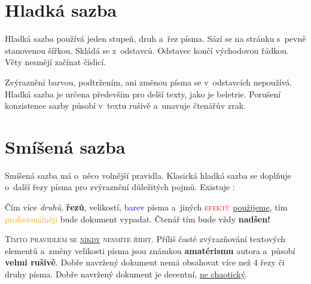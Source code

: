 \documentclass[a4paper, 10pt, twocolumn]{article}
\begin{document}

	\section{Hladká sazba}
	\label{sec:1}

        Hladká sazba používá jeden stupeň, druh a~řez písma.
        Sází se na stránku s~pevně stanovenou šířkou.
        Skládá se z~odstavců. Odstavec končí východovou řádkou.
        Věty nesmějí začínat číslicí.

    	Zvýraznění barvou, podtržením, ani změnou písma se v~odstavcích nepoužívá.
        Hladká sazba je určena především pro delší texty, jako je beletrie.
        Porušení konzistence sazby působí v~textu rušivě a~unavuje čtenářův zrak.

	\section{Smíšená sazba}
	\label{sec:2}
    
        Smíšená sazba má o~něco volnější pravidla. Klasická hladká sazba se doplňuje o~další řezy písma pro zvýraznění důležitých pojmů. Existuje :
    
    	\begin{adjustwidth}{0.62cm}{0.80cm}
    		\medskip
    		\setlength{\parindent}{0.5cm}
    		\hspace{\parindent}
    		Čím více \emph{druhů}, \textbf{řezů}, {\huge velikostí}, \textcolor{blue}{barev} písma a~jiných \textsc{\textcolor{red}{efektů}} \underline{použijeme}, tím \textcolor{orange}{profesionálněji} bude {\Large{\selectfont dokument}} vypadat.
            {\tiny Čtenář} tím bude vždy \textbf{\Huge{nadšen!}}
    		\medskip
    	\end{adjustwidth}
    
    	\textsc{Tímto pravidlem se \underline{nikdy} nesmíte řídit.}
        Příliš časté zvýrazňování textových elementů a~změny {\tiny velikosti} písma jsou známkou \textbf{amatérismu} autora a~působí \textbf{\selectfont velmi rušivě}.
        Dobře navržený dokument nemá obsahovat více než 4 řezy či druhy písma.
        Dobře navržený dokument je decentní, \underline{ne chaotický}.
    
\end{document}
